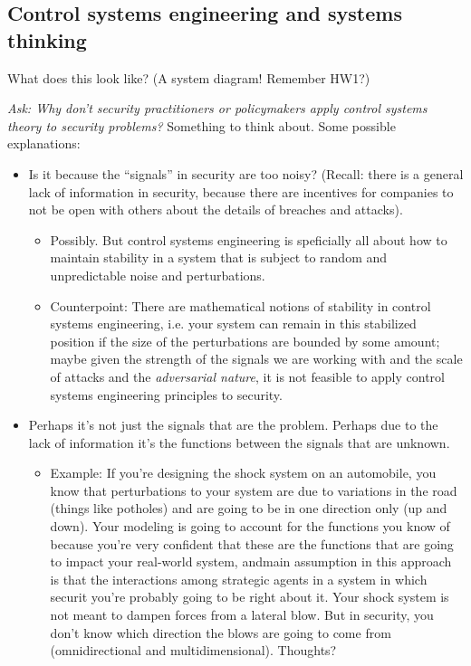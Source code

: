 \documentclass[11pt]{article}
\begin{document}
\subsection{Control systems engineering and systems thinking}

What does this look like? (A system diagram! Remember HW1?)

{\it Ask: Why don't security practitioners or policymakers apply control systems theory to security problems?} Something to think about. Some possible explanations:
\begin{itemize}
    \item Is it because the ``signals'' in security are too noisy? (Recall: there is a general lack of information in security, because there are incentives for companies to not be open with others about the details of breaches and attacks).
    \begin{itemize}
        \item Possibly. But control systems engineering is speficially all about how to maintain stability in a system that is subject to random and unpredictable noise and perturbations.
        \item Counterpoint: There are mathematical notions of stability in control systems engineering, i.e. your system can remain in this stabilized position if the size of the perturbations are bounded by some amount; maybe given the strength of the signals we are working with and the scale of attacks and the {\it adversarial nature}, it is not feasible to apply control systems engineering principles to security. 
    \end{itemize}
    \item Perhaps it's not just the signals that are the problem. Perhaps due to the lack of information it's the functions between the signals that are unknown.
    \begin{itemize}
        \item Example: If you're designing the shock system on an automobile, you know that perturbations to your system are due to variations in the road (things like potholes) and are going to be in one direction only (up and down). Your modeling is going to account for the functions you know of because you're very confident that these are the functions that are going to impact your real-world system, andmain assumption in this
        approach is that the interactions among strategic agents in
        a system in which securit you're probably going to be right about it.  Your shock system is not meant to dampen forces from a lateral blow. But in security, you don't know which direction the blows are going to come from (omnidirectional and multidimensional). Thoughts? 
    \end{itemize}
\end{itemize}
\end{document}
